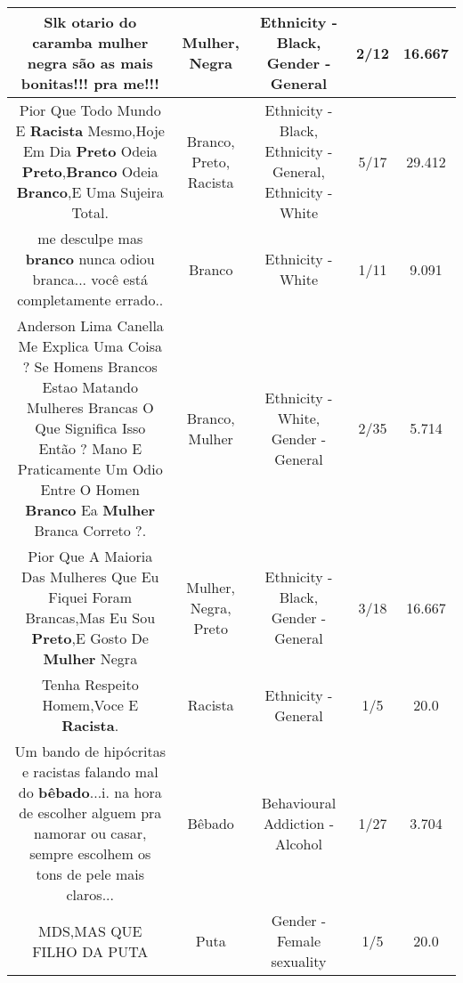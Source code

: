 \documentclass[11pt]{article}
\newlength\mylength
\begin{document}
\begin{center}
\begin{longtable}{|C{.65\mylength}|C{.30\mylength}|C{.12\mylength}|C{.12\mylength}|C{.12\mylength}|}
  \small Slk otario do caramba \textbf{mulher} \textbf{negra} são as mais bonitas!!! pra me!!!\normalsize   & Mulher, Negra & Ethnicity - Black, Gender - General & 2/12 & 16.667 \\  \hline
  \small Pior Que Todo Mundo E \textbf{Racista} Mesmo,Hoje Em Dia \textbf{Preto} Odeia \textbf{Preto},\textbf{Branco} Odeia \textbf{Branco},E Uma Sujeira Total.\normalsize   & Branco, Preto, Racista & Ethnicity - Black, Ethnicity - General, Ethnicity - White & 5/17 & 29.412 \\  \hline
  \small me desculpe mas \textbf{branco} nunca odiou branca... você está completamente errado..\normalsize   & Branco & Ethnicity - White & 1/11 & 9.091 \\  \hline
  \small Anderson Lima Canella Me Explica Uma Coisa ? Se Homens Brancos Estao Matando Mulheres Brancas O Que Significa Isso Então ? Mano E Praticamente Um Odio Entre O Homen \textbf{Branco} Ea \textbf{Mulher} Branca Correto ?.\normalsize   & Branco, Mulher & Ethnicity - White, Gender - General & 2/35 & 5.714 \\  \hline
  \small Pior Que A Maioria Das Mulheres Que Eu Fiquei Foram Brancas,Mas Eu Sou \textbf{Preto},E Gosto De \textbf{Mulher} Negra\normalsize   & Mulher, Negra, Preto & Ethnicity - Black, Gender - General & 3/18 & 16.667 \\  \hline
  \small Tenha Respeito Homem,Voce E \textbf{Racista}.\normalsize   & Racista & Ethnicity - General & 1/5 & 20.0 \\  \hline
  \small Um bando de hipócritas e racistas falando mal do \textbf{bêbado}...i. na hora de escolher alguem pra namorar ou casar, sempre escolhem os tons de pele mais claros...\normalsize   & Bêbado & Behavioural Addiction - Alcohol & 1/27 & 3.704 \\  \hline
  \small MDS,MAS QUE FILHO DA PUTA\normalsize   & Puta & Gender - Female sexuality & 1/5 & 20.0 \\  \hline

\end{longtable}
\end{center}
\end{document}
